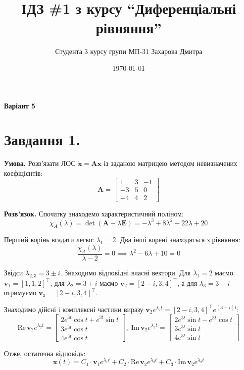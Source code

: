 \documentclass[14pt]{extarticle}
\title{ІДЗ \#1 з курсу ``Диференціальні рівняння''}
\author{Студента 3 курсу групи МП-31 Захарова Дмитра}
\date{\today}
\begin{document}
\maketitle

\textbf{Варіант 5}

\section*{Завдання 1.} 

\textbf{Умова.} Розв'язати ЛОС $\dot{\textbf{x}} = \boldsymbol{A}\textbf{x}$ із заданою матрицею методом невизначених коефіцієнтів:
\[
\boldsymbol{A} = \begin{bmatrix}
    1 & 3 & -1 \\
    -3 & 5 & 0 \\
    -4 & 4 & 2
\end{bmatrix}
\]

\textbf{Розв'язок.} Спочатку знаходемо характеристичний поліном:
\[
\chi_A(\lambda) = \det (\boldsymbol{A} - \lambda \boldsymbol{E}) = -\lambda^3 + 8\lambda^2 - 22\lambda + 20
\]

Перший корінь вгадати легко: $\lambda_1 = 2$. Два інші корені знаходяться з рівняння:
\[
\frac{\chi_A(\lambda)}{\lambda - 2} = 0 \implies \lambda^2 - 6\lambda+10 = 0
\]

Звідси $\lambda_{2,3} = 3 \pm i$. Знаходимо відповідні власні вектори. Для $\lambda_1=2$ маємо $\textbf{v}_1 = [1,1,2]^{\top}$, для $\lambda_2=3+i$ маємо $\textbf{v}_2=[2-i,3,4]^{\top}$, а для $\lambda_3=3-i$ отримуємо $\textbf{v}_3=[2+i,3,4]^{\top}$.

Знаходимо дійсні і комплексні частини виразу $\mathbf{v}_2e^{\lambda_2 t} = [2-i,3,4]^{\top}e^{(3+i)t}$:
\[
\text{Re} \, \mathbf{v}_2e^{\lambda_2 t} = \begin{bmatrix}
2e^{3t}\cos t + e^{3t}\sin t \\
3e^{3t}\cos t \\ 4e^{3t}\cos t
\end{bmatrix}, \; \text{Im} \, \mathbf{v}_2e^{\lambda_2 t} = \begin{bmatrix}
   2e^{3t}\sin t - e^{3t} \cos t \\ 3e^{3t}\sin t \\ 4e^{3t}\sin t
\end{bmatrix}
\]

Отже, остаточна відповідь:
\[
\mathbf{x}(t) = C_1 \cdot \mathbf{v}_1e^{\lambda_1 t} + C_2\cdot\text{Re}\,\mathbf{v}_2e^{\lambda_2t} + C_3\cdot\text{Im}\,\mathbf{v}_2e^{\lambda_2t}
\]
\end{document}
